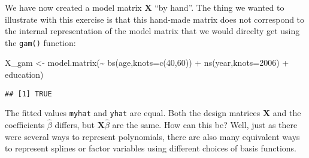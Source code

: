 \documentclass[
]{article}
\newenvironment{Shaded}{\begin{snugshade}}{\end{snugshade}}
\newcommand{\AttributeTok}[1]{\textcolor[rgb]{0.77,0.63,0.00}{#1}}
\newcommand{\CommentTok}[1]{\textcolor[rgb]{0.56,0.35,0.01}{\textit{#1}}}
\newcommand{\DecValTok}[1]{\textcolor[rgb]{0.00,0.00,0.81}{#1}}
\newcommand{\FunctionTok}[1]{\textcolor[rgb]{0.00,0.00,0.00}{#1}}
\newcommand{\NormalTok}[1]{#1}
\newcommand{\OtherTok}[1]{\textcolor[rgb]{0.56,0.35,0.01}{#1}}
\newcommand{\SpecialCharTok}[1]{\textcolor[rgb]{0.00,0.00,0.00}{#1}}
\begin{document}
We have now created a model matrix \(\mathbf X\) ``by hand''. The thing
we wanted to illustrate with this exercise is that this hand-made matrix
does not correspond to the internal representation of the model matrix
that we would direclty get using the \texttt{gam()} function:

\begin{Shaded}
\begin{Highlighting}[]
\NormalTok{X\_gam }\OtherTok{\textless{}{-}} \FunctionTok{model.matrix}\NormalTok{(}\SpecialCharTok{\textasciitilde{}} \FunctionTok{bs}\NormalTok{(age,}\AttributeTok{knots=}\FunctionTok{c}\NormalTok{(}\DecValTok{40}\NormalTok{,}\DecValTok{60}\NormalTok{)) }\SpecialCharTok{+} \FunctionTok{ns}\NormalTok{(year,}\AttributeTok{knots=}\DecValTok{2006}\NormalTok{) }\SpecialCharTok{+}\NormalTok{ education)}
\end{Highlighting}
\end{Shaded}

\begin{Shaded}
\end{Shaded}

\begin{verbatim}
## [1] TRUE
\end{verbatim}

The fitted values \texttt{myhat} and \texttt{yhat} are equal. Both the
design matrices \(\mathbf X\) and the coefficients \(\hat{\beta}\)
differs, but \(\mathbf X \hat{\beta}\) are the same. How can this be?
Well, just as there were several ways to represent polynomials, there
are also many equivalent ways to represent splines or factor variables
using different choices of basis functions.
\end{document}
